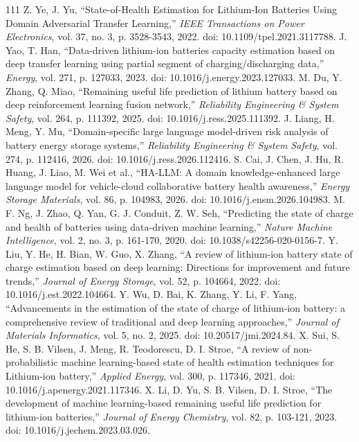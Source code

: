 \documentclass[journal]{IEEEtran}
\begin{document}
\begin{thebibliography}{111}
Z. Ye, J. Yu, ``State-of-Health Estimation for Lithium-Ion Batteries Using Domain Adversarial Transfer Learning,'' \emph{IEEE Transactions on Power Electronics}, vol. 37, no. 3, p. 3528-3543, 2022. doi: 10.1109/tpel.2021.3117788.
J. Yao, T. Han, ``Data-driven lithium-ion batteries capacity estimation based on deep transfer learning using partial segment of charging/discharging data,'' \emph{Energy}, vol. 271, p. 127033, 2023. doi: 10.1016/j.energy.2023.127033.
M. Du, Y. Zhang, Q. Miao, ``Remaining useful life prediction of lithium battery based on deep reinforcement learning fusion network,'' \emph{Reliability Engineering \& System Safety}, vol. 264, p. 111392, 2025. doi: 10.1016/j.ress.2025.111392.
J. Liang, H. Meng, Y. Mu, ``Domain-specific large language model-driven risk analysis of battery energy storage systems,'' \emph{Reliability Engineering \& System Safety}, vol. 274, p. 112416, 2026. doi: 10.1016/j.ress.2026.112416.
S. Cai, J. Chen, J. Hu, R. Huang, J. Liao, M. Wei et al., ``HA-LLM: A domain knowledge-enhanced large language model for vehicle-cloud collaborative battery health awareness,'' \emph{Energy Storage Materials}, vol. 86, p. 104983, 2026. doi: 10.1016/j.ensm.2026.104983.
M. F. Ng, J. Zhao, Q. Yan, G. J. Conduit, Z. W. Seh, ``Predicting the state of charge and health of batteries using data-driven machine learning,'' \emph{Nature Machine Intelligence}, vol. 2, no. 3, p. 161-170, 2020. doi: 10.1038/s42256-020-0156-7.
Y. Liu, Y. He, H. Bian, W. Guo, X. Zhang, ``A review of lithium-ion battery state of charge estimation based on deep learning: Directions for improvement and future trends,'' \emph{Journal of Energy Storage}, vol. 52, p. 104664, 2022. doi: 10.1016/j.est.2022.104664.
Y. Wu, D. Bai, K. Zhang, Y. Li, F. Yang, ``Advancements in the estimation of the state of charge of lithium-ion battery: a comprehensive review of traditional and deep learning approaches,'' \emph{Journal of Materials Informatics}, vol. 5, no. 2, 2025. doi: 10.20517/jmi.2024.84.
X. Sui, S. He, S. B. Vilsen, J. Meng, R. Teodorescu, D. I. Stroe, ``A review of non-probabilistic machine learning-based state of health estimation techniques for Lithium-ion battery,'' \emph{Applied Energy}, vol. 300, p. 117346, 2021. doi: 10.1016/j.apenergy.2021.117346.
X. Li, D. Yu, S. B. Vilsen, D. I. Stroe, ``The development of machine learning-based remaining useful life prediction for lithium-ion batteries,'' \emph{Journal of Energy Chemistry}, vol. 82, p. 103-121, 2023. doi: 10.1016/j.jechem.2023.03.026.

\end{thebibliography}
\end{document}
